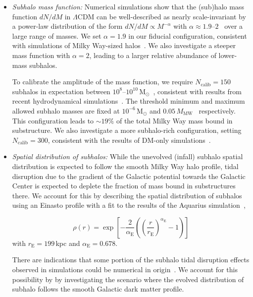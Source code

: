 \documentclass[twocolumn]{aastex63}
\begin{document}
\begin{itemize}
\item \emph{Subhalo mass function:} Numerical simulations show that the (sub)halo mass function $dN/dM$ in $\Lambda$CDM can be well-described as nearly scale-invariant by a power-law distribution of the form $dN/dM\propto M^{-\alpha}$ with $\alpha\approx1.9$--$2$~\cite{Moline:2016pbm} over a large range of masses. We set $\alpha=1.9$ in our fiducial configuration, consistent with simulations of Milky Way-sized halos~\cite{Madau:2008fr,Springel:2008cc}. We also investigate a steeper mass function with $\alpha=2$, leading to a larger relative abundance of lower-mass subhalos.

To calibrate the amplitude of the mass function, we require $N_\mathrm{calib}=150$ subhalos in expectation between $10^8$--$10^{10}$\,M$_\odot$~\cite{Hutten:2016jko}, consistent with results from recent hydrodynamical simulations~\cite{Mollitor:2014ara,Sawala:2015cdf}. The threshold minimum and maximum allowed subhalo masses are fixed at $10^{-6}$\,M$_\odot$ and $0.05\,M_\mathrm{MW}$~\cite{Hiroshima:2018kfv} respectively. This configuration leads to $\sim 19\%$ of the total Milky Way mass bound in substructure. We also investigate a more subhalo-rich configuration, setting $N_\mathrm{calib}=300$, consistent with the results of DM-only simulations~\cite{Springel:2008cc}.

\item \emph{Spatial distribution of subhalos:}  While the unevolved (infall) subhalo spatial distribution is expected to follow the smooth Milky Way halo profile, tidal disruption due to the gradient of the Galactic potential towards the Galactic Center is expected to deplete the fraction of mass bound in substructures there. We account for this by describing the spatial distribution of subhalos using an Einasto profile with a fit to the results of the Aquarius simulation~\cite{Springel:2008cc,Hutten:2016jko}, 

\begin{equation}
\rho(r) = \exp\left[-\frac{2}{\alpha_\mathrm{E}}\left(\left(\frac{r}{r_\mathrm{E}}\right)^{\alpha_\mathrm{E}} - 1\right)\right]
\end{equation}
with $r_\mathrm{E}=199$\,kpc and $\alpha_\mathrm{E}=0.678$.

There are indications that some portion of the subhalo tidal disruption effects observed in simulations could be numerical in origin~\cite{vandenBosch:2017ynq,vandenBosch:2018tyt}. We account for this possibility by by investigating the scenario where the evolved distribution of subhalo follows the smooth Galactic dark matter profile.


\end{itemize}
\end{document}
